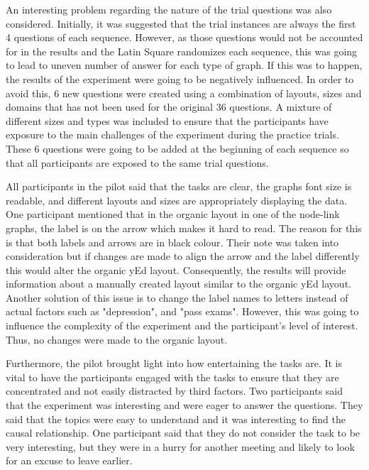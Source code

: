 \documentclass{l4proj}
\begin{document}
An interesting problem regarding the nature of the trial questions was also considered. Initially, it was suggested that the trial instances are always the first 4 questions of each sequence. However, as those questions would not be accounted for in the results and the Latin Square randomizes each sequence, this was going to lead to uneven number of answer for each type of graph. If this was to happen, the results of the experiment were going to be negatively influenced. In order to avoid this, 6 new questions were created using a combination of layouts, sizes and domains that has not been used for the original 36 questions. A mixture of different sizes and types was included to ensure that the participants have exposure to the main challenges of the experiment during the practice trials. These 6 questions were going to be added at the beginning of each sequence so that all participants are exposed to the same trial questions.  

All participants in the pilot said that the tasks are clear, the graphs font size is readable, and different layouts and sizes are appropriately displaying the data. One participant mentioned that in the organic layout in one of the node-link graphs, the label is on the arrow which makes it hard to read. The reason for this is that both labels and arrows are in black colour. Their note was taken into consideration but if changes are made to align the arrow and the label differently this would alter the organic yEd layout. Consequently, the results will provide information about a manually created layout similar to the organic yEd layout. Another solution of this issue is to change the label names to letters instead of actual factors such as "depression", and "pass exams". However, this was going to influence the complexity of the experiment and the participant's level of interest. Thus, no changes were made to the organic layout.

Furthermore, the pilot brought light into how entertaining the tasks are. It is vital to have the participants engaged with the tasks to ensure that they are concentrated and not easily distracted by third factors. Two participants said that the experiment was interesting and were eager to answer the questions. They said that the topics were easy to understand and it was interesting to find the causal relationship. One participant said that they do not consider the task to be very interesting, but they were in a hurry for another meeting and likely to look for an excuse to leave earlier.  
\end{document}
